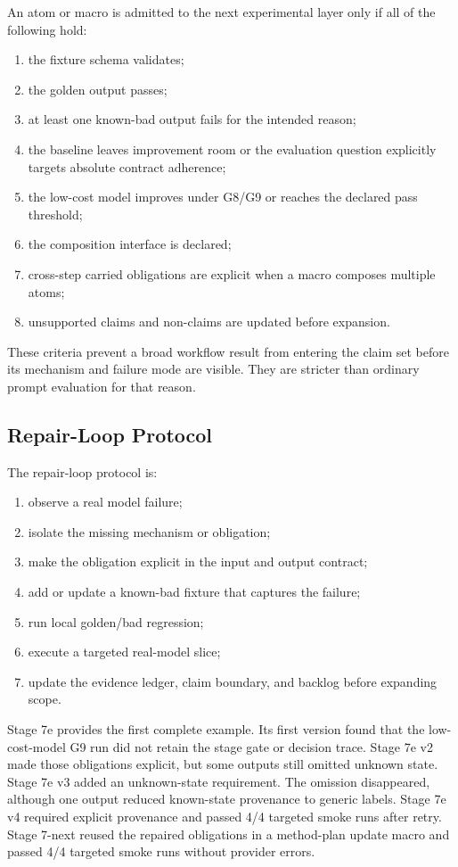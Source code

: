 \documentclass[11pt]{article}
\begin{document}
An atom or macro is admitted to the next experimental layer only if all of the following hold:

\begin{enumerate}
\item the fixture schema validates;
\item the golden output passes;
\item at least one known-bad output fails for the intended reason;
\item the baseline leaves improvement room or the evaluation question explicitly targets absolute contract adherence;
\item the low-cost model improves under G8/G9 or reaches the declared pass threshold;
\item the composition interface is declared;
\item cross-step carried obligations are explicit when a macro composes multiple atoms;
\item unsupported claims and non-claims are updated before expansion.
\end{enumerate}

These criteria prevent a broad workflow result from entering the claim set before its mechanism and failure mode are visible. They are stricter than ordinary prompt evaluation for that reason.

\subsection{Repair-Loop Protocol}

The repair-loop protocol is:

\begin{enumerate}
\item observe a real model failure;
\item isolate the missing mechanism or obligation;
\item make the obligation explicit in the input and output contract;
\item add or update a known-bad fixture that captures the failure;
\item run local golden/bad regression;
\item execute a targeted real-model slice;
\item update the evidence ledger, claim boundary, and backlog before expanding scope.
\end{enumerate}

Stage 7e provides the first complete example. Its first version found that the low-cost-model G9 run did not retain the stage gate or decision trace. Stage 7e v2 made those obligations explicit, but some outputs still omitted unknown state. Stage 7e v3 added an unknown-state requirement. The omission disappeared, although one output reduced known-state provenance to generic labels. Stage 7e v4 required explicit provenance and passed 4/4 targeted smoke runs after retry. Stage 7-next reused the repaired obligations in a method-plan update macro and passed 4/4 targeted smoke runs without provider errors.
\end{document}
